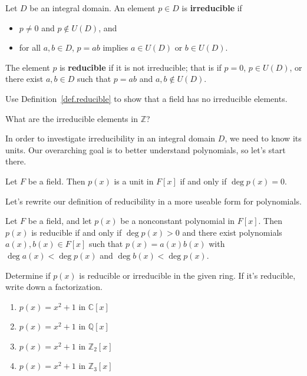 \begin{definition}\label{def.reducible}
Let $D$ be an integral domain. An element $p\in D$ is \textbf{irreducible} if 
\begin{itemize}
\item $p\neq 0$ and $p\notin U(D)$, and
\item for all $a,b\in D$, $p = ab$ implies $a\in U(D)$ or $b\in U(D)$.
\end{itemize} 
The element $p$ is \textbf{reducible} if it is not irreducible; that is if $p=0$, $p\in U(D)$, or there exist $a,b\in D$ such that $p = ab$ and $a,b\notin U(D)$. 
\end{definition}

\begin{problem}
Use Definition~\ref{def.reducible} to show that a field has no irreducible elements.
\end{problem}

\begin{problem}
What are the irreducible elements in $\mathbb{Z}$?
\end{problem}

In order to investigate irreducibility in an integral domain $D$, we need to know its units. Our overarching goal is to better understand polynomials, so let's 
start there. 

\begin{theorem}\label{thm.UnitsFAdjoinx}
Let $F$ be a field. Then $p(x)$ is a unit in $F[x]$ if and only if $\deg p(x) = 0$. 
\end{theorem}

Let's  rewrite our definition of reducibility in a more useable form for polynomials.
\begin{theorem}\label{thm.ReduciblePolynomials}
Let $F$ be a field, and let $p(x)$ be a nonconstant polynomial in $F[x]$. Then $p(x)$ is reducible if and only if $\deg p(x) > 0$ and there exist polynomials $a(x),b(x) \in F[x]$ such that $p(x) = a(x)b(x)$ with $\deg a(x) <\deg p(x)$ and $\deg b(x) <\deg p(x)$.
\end{theorem}

\begin{problem}
Determine if $p(x)$ is reducible or irreducible in the given ring. If it's reducible, write down a factorization.
\begin{multicols}{2}
\begin{enumerate}
\item $p(x) = x^2+1$ in $\mathbb{C}[x]$
\item $p(x) = x^2+1$ in $\mathbb{Q}[x]$
\item $p(x) = x^2+1$ in $\mathbb{Z}_2[x]$
\item $p(x) = x^2+1$ in $\mathbb{Z}_3[x]$
\end{enumerate}
\end{multicols}
\end{problem}

